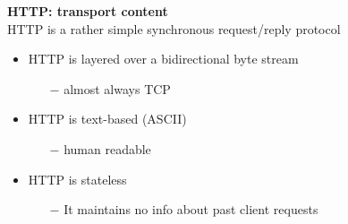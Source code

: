 \documentclass[a4paper, fontsize=8pt, landscape, DIV=1]{scrartcl}
\begin{document}
\begin{multicols*}{4}
		\textbf{HTTP: transport content}\\
		HTTP is a rather simple synchronous request/reply protocol
		\begin{itemize}[noitemsep]
			\item HTTP is layered over a bidirectional byte stream
			\begin{itemize}
				\item[$-$] almost always TCP
			\end{itemize}
			\item HTTP is text-based (ASCII)
			\begin{itemize}
				\item[$-$] human readable
 			\end{itemize}
 			\item HTTP is stateless
 			\begin{itemize}
 				\item[$-$] It maintains no info about past client requests
 			\end{itemize}
		\end{itemize}
		

\end{multicols*}
\end{document}
